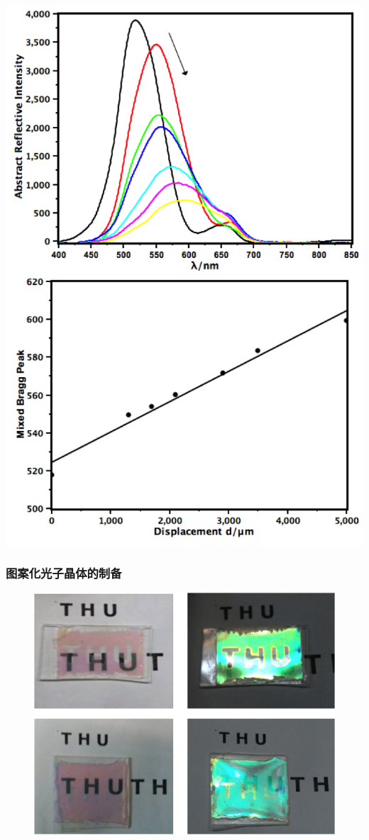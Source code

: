 \documentclass{beamer}
\begin{document}
\begin{frame}
\begin{minipage}{0.48\textwidth}
    \includegraphics[width=0.85\linewidth]{figures/distance-2D.png}
  \end{minipage}
\end{frame}

\begin{frame}
  \frametitle{图案化光子晶体的制备}
  \begin{figure}
  \centering
  \includegraphics[width=0.76\linewidth]{figures/pattern2DPhC.png}
  \end{figure}
\end{frame}
\end{document}
